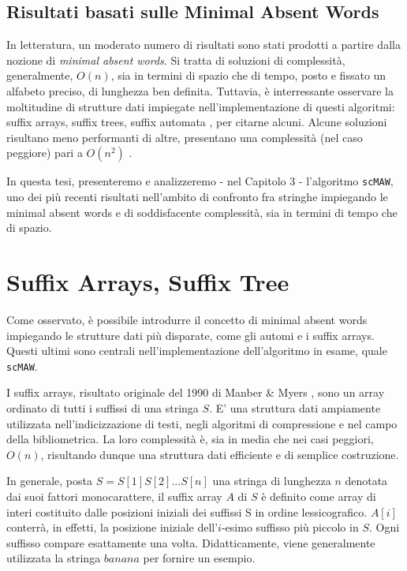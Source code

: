 \subsection{Risultati basati sulle Minimal Absent Words}

In letteratura, un moderato numero di risultati sono stati prodotti a partire dalla nozione di \textit{minimal absent words}. Si tratta di soluzioni di complessità, generalmente, $O(n)$, sia in termini di spazio che di tempo, posto e fissato un alfabeto preciso, di lunghezza ben definita. Tuttavia, è interressante osservare la moltitudine di strutture dati impiegate nell'implementazione di questi algoritmi: suffix arrays, suffix trees, suffix automata \cite{CROCHEMORE1998111}, per citarne alcuni. Alcune soluzioni risultano meno performanti di altre, presentano una complessità (nel caso peggiore) pari a $O(n^2 )$ \cite{findingMaw}.

\vspace{3mm}

In questa tesi, presenteremo e analizzeremo - nel Capitolo 3 - l'algoritmo \verb|scMAW|, uno dei più recenti risultati nell'ambito di confronto fra stringhe impiegando le minimal absent words e di soddisfacente complessità, sia in termini di tempo che di spazio.

\section{Suffix Arrays, Suffix Tree}

Come osservato, è possibile introdurre il concetto di minimal absent words impiegando le strutture dati più disparate, come gli automi e i suffix arrays. Questi ultimi sono centrali nell'implementazione dell'algoritmo in esame, quale \verb|scMAW|.

\vspace{3mm}

I suffix arrays, risultato originale del 1990 di Manber & Myers \cite{suffixArray}, sono un array ordinato di tutti i suffissi di una stringa $S$. E' una struttura dati ampiamente utilizzata nell'indicizzazione di testi, negli algoritmi di compressione e nel campo della bibliometrica. La loro complessità è, sia in media che nei casi peggiori, $O(n)$, risultando dunque una struttura dati efficiente e di semplice costruzione.

\vspace{3mm}

In generale, posta $S=S[1]S[2]...S[n]$ una stringa di lunghezza $n$ denotata dai suoi fattori monocarattere, il suffix array $A$ di $S$ è definito come array di interi costituito dalle posizioni iniziali dei suffissi S in ordine lessicografico. $A[i]$ conterrà, in effetti, la posizione iniziale dell'$i$-esimo suffisso più piccolo in $S$. Ogni suffisso compare esattamente una volta. Didatticamente, viene generalmente utilizzata la stringa $banana$ per fornire un esempio.

